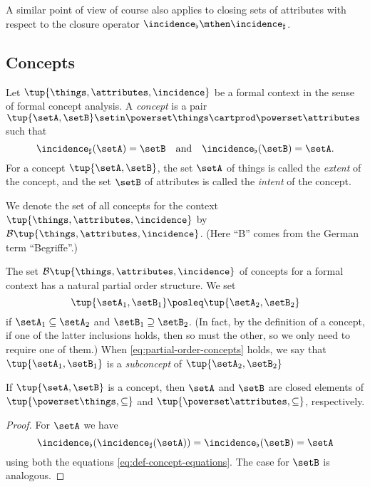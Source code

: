 A similar point of view of course also applies to closing sets of attributes with respect to the closure operator $\incidence_\flat \mthen \incidence_\sharp$.

\subsection{Concepts}

\begin{definition}\label{def:cfa-concept}
Let $\tup{\things, \attributes, \incidence}$ be a formal context in the sense of formal concept analysis. A \emph{concept} is a pair $\tup{\setA, \setB} \setin \powerset\things \cartprod \powerset\attributes$ such that 
\begin{equation}\label{eq:def-concept-equations}
\incidence_\sharp(\setA) = \setB \quad \text{and} \quad \incidence_\flat(\setB) = \setA.
\end{equation}
For a concept $\tup{\setA, \setB}$, the set $\setA$ of things is called the \emph{extent} of the concept, and the set $\setB$ of attributes is called the \emph{intent} of the concept. 

We denote the set of all concepts for the context $\tup{\things, \attributes, \incidence}$ by $\mathcal{B}\tup{\things, \attributes, \incidence}$. (Here ``B'' comes from the German term ``Begriffe''.) 
\end{definition}

The set $\mathcal{B}\tup{\things, \attributes, \incidence}$ of concepts for a formal context has a natural partial order structure. We set
\begin{equation}\label{eq:partial-order-concepts}
\tup{\setA_1, \setB_1} \posleq \tup{\setA_2, \setB_2}
\end{equation}
if $\setA_1 \subseteq \setA_2$ and $\setB_1 \supseteq \setB_2$. (In fact, by the definition of a concept, if one of the latter inclusions holds, then so must the other, so we only need to require one of them.) When \cref{eq:partial-order-concepts} holds, we say that $\tup{\setA_1, \setB_1}$ is a \emph{subconcept} of $\tup{\setA_2, \setB_2}$


\begin{lemma}\label{lem:extents-and-intents-are-closed}
If $\tup{\setA, \setB}$ is a concept, then $\setA$ and $\setB$ are closed elements of $\tup{\powerset \things, \subseteq}$ and $\tup{\powerset \attributes, \subseteq}$, respectively. 
\end{lemma}

\begin{proof}
For $\setA$ we have 
\begin{equation}\label{eq:extents-and-intents-are-closed-proof}
\incidence_\flat(\incidence_\sharp(\setA)) = \incidence_\flat(\setB) = \setA
\end{equation}
using both the equations \cref{eq:def-concept-equations}.
The case for $\setB$ is analogous. 
\end{proof}

